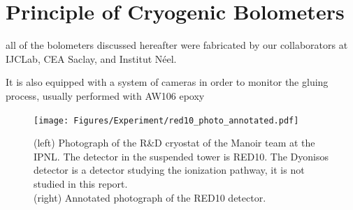 


\section{Principle of Cryogenic Bolometers}

all of the bolometers discussed hereafter were fabricated by our collaborators at IJCLab, CEA Saclay, and Institut N\'eel.

 It is also equipped with a system of cameras in order to monitor the gluing process, usually performed with AW106 epoxy


\begin{figure}[!ht]
\begin{minipage}{0.45\textwidth}
\texttt{[image: Figures/Experiment/red10\_photo\_annotated.pdf]}
\end{minipage}
\caption{(left) Photograph of the R\&D cryostat of the Manoir team at the IPNL. The detector in the suspended tower is RED10. The Dyonisos detector is a detector studying the ionization pathway, it is not studied in this report. \\ (right) Annotated photograph of the RED10 detector.}
\label{photo}
\end{figure}

